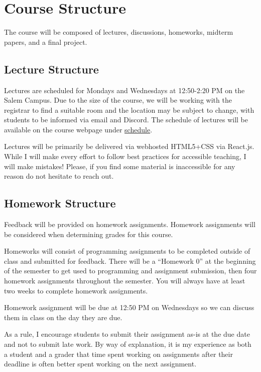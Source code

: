 \documentclass[11pt]{article}
\begin{document}

\section*{Course Structure}

The course will be composed of lectures, discussions, homeworks, midterm papers, and a final project.

\subsection*{Lecture Structure}

Lectures are scheduled for Mondays and Wednesdays at 12:50-2:20 PM on the Salem Campus. Due to the size of the course, we will be working with the registrar to find a suitable room and the location may be subject to change, with students to be informed via email and Discord. The schedule
of lectures will be available on the course webpage under \href{https://cd-public.github.io/courses/sec/sched.html}{schedule}.

\bigskip
\noindent Lectures will be primarily be delivered via webhosted HTML5+CSS via React.js. While I will make every effort to follow best practices for accessible teaching, I will make mistakes! Please, if you find some material is inaccessible for any reason
do not hesitate to reach out.


\subsection*{Homework Structure}

Feedback will be provided on homework assignments. Homework assignments will be considered when determining grades for this course.

\bigskip
\noindent Homeworks will consist of programming assignments to be completed outside of class and submitted
for feedback. There will be a ``Homework 0'' at the beginning of the semester to get used to
programming and assignment submission, then four homework assignments throughout the semester.
You will always have at least two weeks to complete homework assignments.

\bigskip
\noindent Homework assignment will be due at 12:50 PM on Wednesdays so we can discuss them in class on the 
day they are due.

\bigskip
\noindent As a rule, I encourage students to submit their assignment as-is at the due date and not to
submit late work. By way of explanation, it is my experience as both a student and a grader that time spent working on assignments after their deadline is often better spent working on the next assignment.
\end{document}

